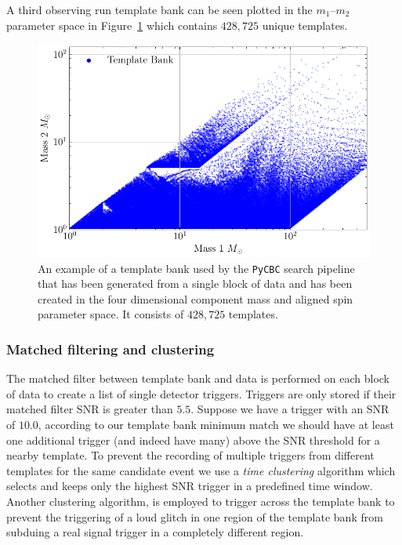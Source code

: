 A third observing run template bank can be seen plotted in the $m_{1}\text{--}m_{2}$ parameter space in Figure~\ref{2:fig:pycbc-o3-template-bank} which contains $428,725$ unique templates.
%
\begin{figure}
    \centering
    \includegraphics[width=0.75\linewidth]{images/2_searches/H1L1V1-PLOT_BANK.pdf}
    \caption{An example of a template bank used by the \texttt{PyCBC} search pipeline that has been generated from a single block of data and has been created in the four dimensional component mass and aligned spin parameter space. It consists of $428,725$ templates.}
    \label{2:fig:pycbc-o3-template-bank}
\end{figure}
%






\subsubsection{Matched filtering and clustering}

The matched filter between template bank and data is performed on each block of data to create a list of single detector triggers. Triggers are only stored if their matched filter SNR is greater than $5.5$. Suppose we have a trigger with an SNR of $10.0$, according to our template bank minimum match we should have at least one additional trigger (and indeed have many) above the SNR threshold for a nearby template. To prevent the recording of multiple triggers from different templates for the same candidate event we use a \textit{time clustering} algorithm which selects and keeps only the highest SNR trigger in a predefined time window. Another clustering algorithm, is employed to trigger across the template bank to prevent the triggering of a loud glitch in one region of the template bank from subduing a real signal trigger in a completely different region.

